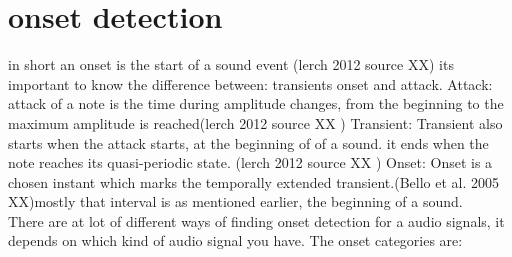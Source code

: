 \section{onset detection}
in short an onset is the start of a sound event (lerch 2012 source XX)
its important to know the difference between: transients onset and attack. 
Attack: attack of a note is the time during amplitude changes, from the beginning to the maximum amplitude is reached(lerch 2012 source XX )
Transient: Transient also starts when the attack starts, at the beginning of of a sound. it ends when the note reaches its quasi-periodic state. (lerch 2012 source XX )
Onset: Onset is a chosen instant which marks the temporally extended transient.(Bello et al. 2005 XX)mostly that interval is as mentioned earlier, the beginning of a sound. 
\\

There are at lot of different ways of  finding onset detection for a audio signals, it depends on which kind of audio signal you have.
The onset categories are:

